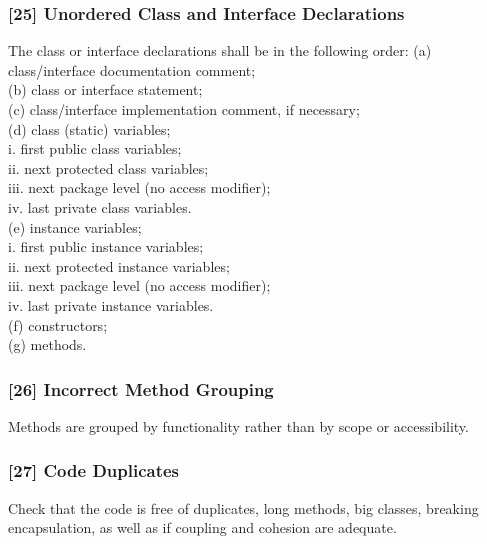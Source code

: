 \subsubsection{[25] Unordered Class and Interface Declarations}
The class or interface declarations shall be in the following order:
(a) class/interface documentation comment; \\
(b) class or interface statement;\\
(c) class/interface implementation comment, if necessary;\\
(d) class (static) variables;\\
i. first public class variables;\\
ii. next protected class variables;\\
iii. next package level (no access modifier);\\
iv. last private class variables. \\
(e) instance variables;\\
i. first public instance variables;\\
ii. next protected instance variables;\\
iii. next package level (no access modifier);\\
iv. last private instance variables. \\
(f) constructors;\\
(g) methods.\\
\subsubsection{[26] Incorrect Method Grouping}
Methods are grouped by functionality rather than by scope or accessibility.
\subsubsection{[27] Code Duplicates}
Check that the code is free of duplicates, long methods, big classes, breaking encapsulation, as well as if coupling and cohesion are adequate.